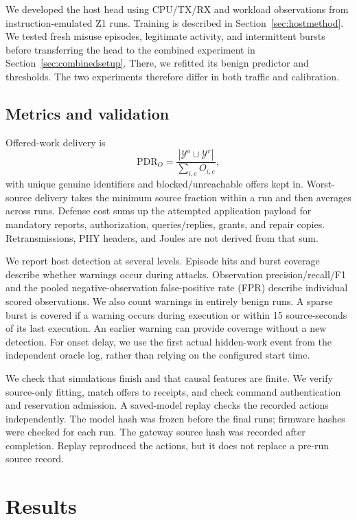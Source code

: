 \documentclass[journal]{IEEEtran}
\begin{document}
We developed the host head using CPU/TX/RX and workload observations from instruction-emulated Z1 runs. Training is described in Section~\ref{sec:hostmethod}. We tested fresh misuse episodes, legitimate activity, and intermittent bursts before transferring the head to the combined experiment in Section~\ref{sec:combinedsetup}. There, we refitted its benign predictor and thresholds. The two experiments therefore differ in both traffic and calibration.

\subsection{Metrics and validation}
Offered-work delivery is
\begin{equation}
\mathrm{PDR}_{O}=\frac{|\mathcal{Y}^{o}\cup\mathcal{Y}^{r}|}{\sum_{i,e}O_{i,e}},
\end{equation}
with unique genuine identifiers and blocked/unreachable offers kept in. Worst-source delivery takes the minimum source fraction within a run and then averages across runs. Defense cost sums up the attempted application payload for mandatory reports, authorization, queries/replies, grants, and repair copies. Retransmissions, PHY headers, and Joules are not derived from that sum.

We report host detection at several levels. Episode hits and burst coverage describe whether warnings occur during attacks. Observation precision/recall/F1 and the pooled negative-observation false-positive rate (FPR) describe individual scored observations. We also count warnings in entirely benign runs. A sparse burst is covered if a warning occurs during execution or within 15 source-seconds of its last execution. An earlier warning can provide coverage without a new detection. For onset delay, we use the first actual hidden-work event from the independent oracle log, rather than relying on the configured start time.

We check that simulations finish and that causal features are finite. We verify source-only fitting, match offers to receipts, and check command authentication and reservation admission. A saved-model replay checks the recorded actions independently. The model hash was frozen before the final runs; firmware hashes were checked for each run. The gateway source hash was recorded after completion. Replay reproduced the actions, but it does not replace a pre-run source record.

\section{Results}
\end{document}
